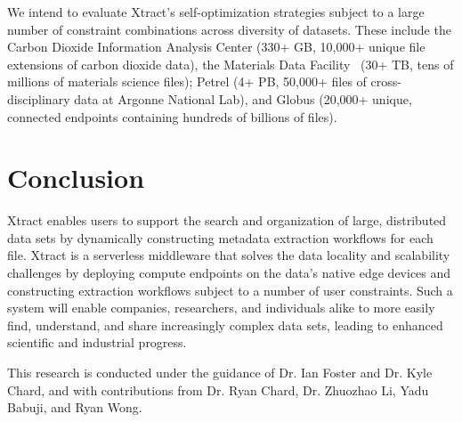 \documentclass[sigconf, 9pt]{acmart}
\newcommand{\name}{Xtract}
\begin{document}
We intend to evaluate \name{}'s self-optimization strategies subject to a large number of constraint combinations across diversity of datasets. 
These include the Carbon Dioxide Information Analysis Center (330+ GB, 10,000+ 
unique file extensions of carbon dioxide data), the Materials Data Facility~\cite{ blaiszik2019mdf} (30+ TB, tens of millions of materials science files); 
Petrel (4+ PB, 50,000+ files of cross-disciplinary data at Argonne National Lab), and Globus (20,000+ unique, connected 
endpoints containing hundreds of billions of files).


\section{Conclusion}
\label{sec:conc}

\name{} enables users to support the search and organization of large, distributed data sets by dynamically constructing metadata extraction 
workflows for each file. \name{} is a serverless middleware that solves the data locality and scalability challenges by deploying compute endpoints on the data's native edge
devices and constructing extraction workflows subject to a number of user constraints. Such a system will enable companies, researchers, and individuals alike to more easily find, understand, and share increasingly 
complex data sets, leading to enhanced scientific and industrial progress. 


\begin{acks}

This research is conducted under the guidance of Dr. Ian Foster and Dr. Kyle Chard, and with contributions
from Dr. Ryan Chard, Dr. Zhuozhao Li, Yadu Babuji, and Ryan Wong. 


\end{acks}


\end{document}
